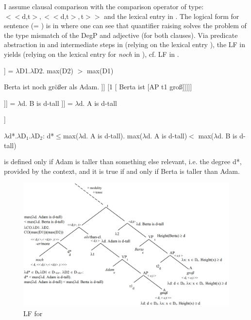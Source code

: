 \documentclass[output=paper,
modfonts
]{langscibook}
\begin{document}
I assume clausal comparison with the comparison operator of type:\\ \mbox{$<<$d,t$>,<<$d,t$>,$t$>>$} \citep[cf.][]{Beck2011} and the lexical entry in . The logical form for sentence  (= ) is in  where one can see that quantifier raising solves the problem of the type mismatch of the DegP and adjective (for both clauses). Via predicate abstraction in  and intermediate steps in (relying on the lexical entry ), the LF in  yields  (relying on the lexical entry for \textit{noch} in ), cf. LF in .

\ea\relax [[-er]] = $\lambda$D1.$\lambda$D2. max(D2) $>$ max(D1) \label{comp-operator}\z

\ea\ea Berta ist noch größer als Adam. \label{B_noch_>_Adam}
\ex\relax [ noch d* [-er than [2[Adam ist [AP t2 groß]]] [1 [ Berta ist [AP t1 groß]]]]] \label{LF_B_noch_>_Adam}
\z\z

\ea\ea \label{PA_on_clauses}\relax [1 [ Berta ist [AP t1 groß]]] = $\lambda$d. B is d-tall
\ex\relax [2 [Adam ist [AP t2 groß]]] =  $\lambda$d. A is d-tall \z\z

\ea\relax [ noch d* [$\lambda$D1.$\lambda$D2. max($\lambda$d. B is d-tall) $>$ max($\lambda$d$'$. A is d$'$-tall) ]] \label{calc_plugin}\z

\ea $\lambda$d*.$\lambda$D$_1$.$\lambda$D$_2$: d*$\leq$max($\lambda$d. A is d-tall). max($\lambda$d. A is d-tall)$<$ max($\lambda$d. B is d-tall)  \label{output_calc}\z

\ea {} is defined only if Adam is taller than something else relevant, i.e. the degree d*, provided by the context, and it is true if and only if Berta is taller than Adam.\z

\begin{figure}
\includegraphics[width=1\textwidth]{figures/LF-mod_comp}
\caption{LF for }
\label{fig:LF_B_noch_>_Adam}
\end{figure}
\end{document}
